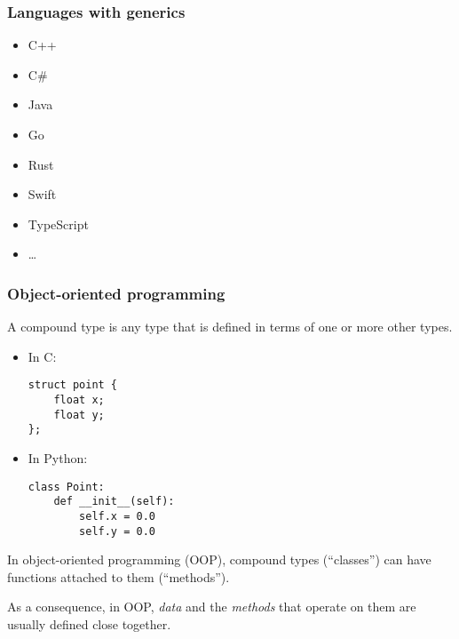 \documentclass[12pt]{article}
\begin{document}
\subsubsection{Languages with generics}

\begin{itemize}
    \item C++
    \item C\#
    \item Java
    \item Go
    \item Rust
    \item Swift
    \item TypeScript
    \item \ldots
\end{itemize}




\subsubsection{Object-oriented programming}

A compound type is any type that is defined in terms of one or more other types.

\begin{itemize}
    \item In C:
\begin{lstlisting}
struct point {
    float x;
    float y;
};
\end{lstlisting}

    \item In Python:
\begin{lstlisting}
class Point:
    def __init__(self):
        self.x = 0.0
        self.y = 0.0
\end{lstlisting}
\end{itemize}

In object-oriented programming (OOP), compound types (``classes'')
can have functions attached to them (``methods'').

As a consequence, in OOP, \emph{data} and the \emph{methods} that operate on them are usually defined close together.
\end{document}
